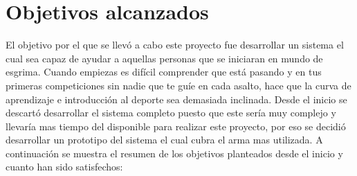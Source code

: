 \section{Objetivos alcanzados}

El objetivo por el que se llevó a cabo este proyecto fue desarrollar un sistema el cual
sea capaz de ayudar a aquellas personas que se iniciaran en mundo de esgrima.
Cuando empiezas es difícil comprender que está pasando y en tus primeras competiciones
sin nadie que te guíe en cada asalto, hace que la curva de aprendizaje e introducción
al deporte sea demasiada inclinada. Desde el inicio se descartó desarrollar el sistema
completo puesto que este sería muy complejo y llevaría mas tiempo del disponible para
realizar este proyecto, por eso se decidió desarrollar un prototipo del sistema el cual
cubra el arma mas utilizada. A continuación se muestra el resumen de los objetivos planteados
desde el inicio y cuanto han sido satisfechos:


